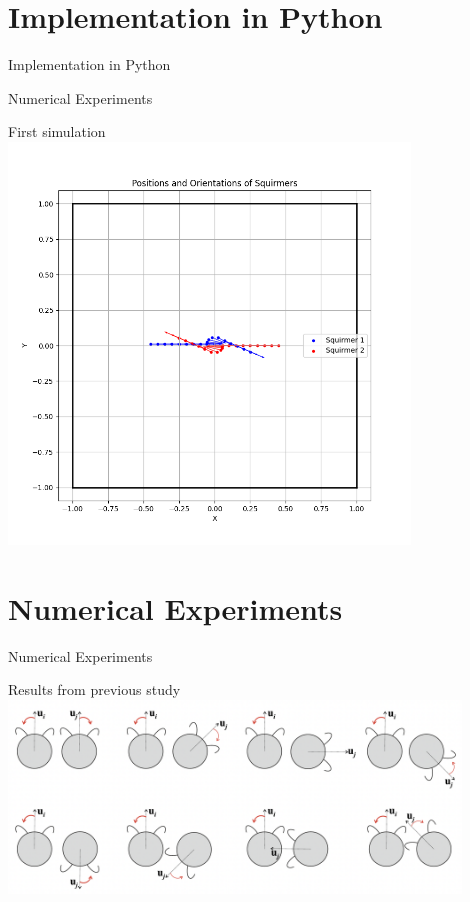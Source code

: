 \documentclass{beamer}
\begin{document}
\section{Implementation in Python}
\begin{frame}{Implementation in Python}
    

\begin{frame}{Numerical Experiments}
    \begin{center}
        First simulation
        \includegraphics[width=0.8\textwidth]{../../graphs/squirmers_colliding.png}
    \end{center}
\end{frame}

\section{Numerical Experiments}
\begin{frame}{Numerical Experiments}
    \begin{center}
        Results from previous study \cite{Stark}
        \includegraphics[width=0.9\textwidth]{../images/stark_behavior.png}
        \cite{Stark}
    \end{center}
\end{frame}


\end{frame}
\end{document}
